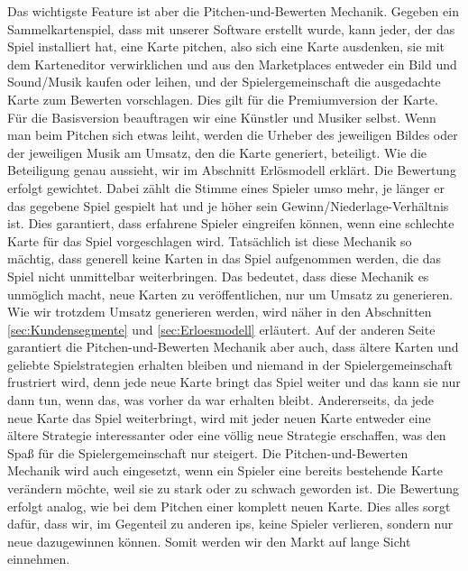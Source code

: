 \documentclass[fontsize=12, a4aper]{scrartcl}
\begin{document}
\noindent Das wichtigste Feature ist aber die Pitchen-und-Bewerten Mechanik. Gegeben ein Sammelkartenspiel, dass mit unserer Software erstellt wurde, kann jeder, der das Spiel installiert hat, eine Karte pitchen, also sich eine Karte ausdenken, sie mit dem Karteneditor verwirklichen und aus den Marketplaces entweder ein Bild und Sound/Musik kaufen oder leihen, und der Spielergemeinschaft die ausgedachte Karte zum Bewerten vorschlagen. Dies gilt für die Premiumversion der Karte. Für die Basisversion beauftragen wir eine Künstler und Musiker selbst. Wenn man beim Pitchen sich etwas leiht, werden die Urheber des jeweiligen Bildes oder der jeweiligen Musik am Umsatz, den die Karte generiert, beteiligt. Wie die Beteiligung genau aussieht, wir im Abschnitt \glqq Erlösmodell\grqq{} erklärt. Die Bewertung erfolgt gewichtet. Dabei zählt die Stimme eines Spieler umso mehr, je länger er das gegebene Spiel gespielt hat und je höher sein Gewinn/Niederlage-Verhältnis ist. Dies garantiert, dass erfahrene Spieler eingreifen können, wenn eine schlechte Karte für das Spiel vorgeschlagen wird. Tatsächlich ist diese Mechanik so mächtig, dass generell keine Karten in das Spiel aufgenommen werden, die das Spiel nicht unmittelbar weiterbringen. Das bedeutet, dass diese Mechanik es unmöglich macht, neue Karten zu veröffentlichen, nur um Umsatz zu generieren. Wie wir trotzdem Umsatz generieren werden, wird näher in den Abschnitten \ref{sec:Kundensegmente} und \ref{sec:Erloesmodell} erläutert. Auf der anderen Seite garantiert die Pitchen-und-Bewerten Mechanik aber auch, dass ältere Karten und geliebte Spielstrategien erhalten bleiben und niemand in der Spielergemeinschaft frustriert wird, denn jede neue Karte bringt das Spiel weiter und das kann sie nur dann tun, wenn das, was vorher da war erhalten bleibt. Andererseits, da jede neue Karte das Spiel weiterbringt, wird mit jeder neuen Karte entweder eine ältere Strategie interessanter oder eine völlig neue Strategie erschaffen, was den Spaß für die Spielergemeinschaft nur steigert. Die Pitchen-und-Bewerten Mechanik wird auch eingesetzt, wenn ein Spieler eine bereits bestehende Karte verändern möchte, weil sie zu stark oder zu schwach geworden ist. Die Bewertung erfolgt analog, wie bei dem Pitchen einer komplett neuen Karte. Dies alles sorgt dafür, dass wir, im Gegenteil zu anderen \acp{ip}, keine Spieler verlieren, sondern nur neue dazugewinnen können. Somit werden wir den Markt auf lange Sicht einnehmen.\hfill\newline
\end{document}
